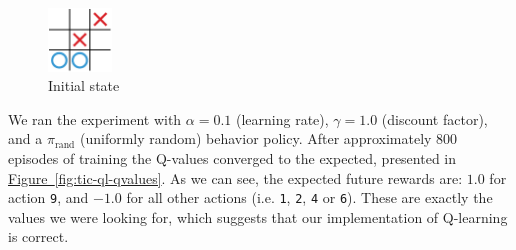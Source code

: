 \documentclass{article}
\begin{document}
\begin{figure}[!h]
    \centering
    \includegraphics[width=0.15\textwidth]{figures/tic_ql_tab_current.pdf}
    \caption{Initial state}
    \label{fig:tic-ql-tab-cur}
\end{figure}

We ran the experiment with $\alpha = 0.1$ (learning rate), $\gamma=1.0$ (discount factor), and a
$\pi_{\textrm{rand}}$ (uniformly random) behavior policy. After approximately 800 episodes of
training the Q-values converged to the expected, presented in \hyperref[fig:tic-ql-qvalues]
{Figure~\ref*{fig:tic-ql-qvalues}}. As we can see, the expected future rewards are: $1.0$ for action
\texttt{9}, and $-1.0$ for all other actions (i.e. \texttt{1}, \texttt{2}, \texttt{4} or
\texttt{6}). These are exactly the values we were looking for, which suggests that our
implementation of Q-learning is correct.


\end{document}
